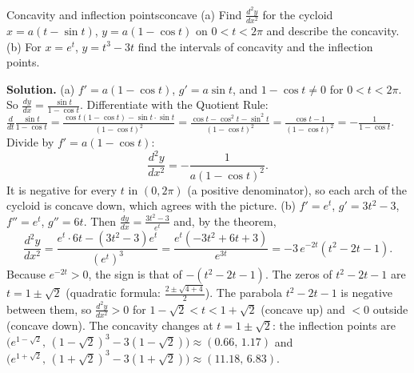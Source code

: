 \documentclass[11pt]{article}
\begin{document}
\begin{exmp}{Concavity and inflection points}{concave}
(a) Find $\frac{d^2y}{dx^2}$ for the cycloid $x=a(t-\sin t)$, $y=a(1-\cos t)$ on $0<t<2\pi$ and describe the concavity. (b) For $x=e^t$, $y=t^3-3t$ find the intervals of concavity and the inflection points.

\textbf{Solution.} (a) $f'=a(1-\cos t)$, $g'=a\sin t$, and $1-\cos t\ne0$ for $0<t<2\pi$. So $\frac{dy}{dx}=\frac{\sin t}{1-\cos t}$. Differentiate with the Quotient Rule: $\frac{d}{dt}\frac{\sin t}{1-\cos t}=\frac{\cos t(1-\cos t)-\sin t\cdot\sin t}{(1-\cos t)^2}=\frac{\cos t-\cos^2t-\sin^2t}{(1-\cos t)^2}=\frac{\cos t-1}{(1-\cos t)^2}=-\frac1{1-\cos t}$. Divide by $f'=a(1-\cos t)$:
\[
\frac{d^2y}{dx^2}=-\frac1{a(1-\cos t)^2}.
\]
It is negative for every $t$ in $(0,2\pi)$ (a positive denominator), so each arch of the cycloid is concave down, which agrees with the picture. (b) $f'=e^t$, $g'=3t^2-3$, $f''=e^t$, $g''=6t$. Then $\frac{dy}{dx}=\frac{3t^2-3}{e^t}$ and, by the theorem,
\[
\frac{d^2y}{dx^2}=\frac{e^t\cdot6t-(3t^2-3)e^t}{(e^t)^3}=\frac{e^t\left(-3t^2+6t+3\right)}{e^{3t}}=-3\,e^{-2t}\left(t^2-2t-1\right).
\]
Because $e^{-2t}>0$, the sign is that of $-(t^2-2t-1)$. The zeros of $t^2-2t-1$ are $t=1\pm\sqrt2$ (quadratic formula: $\frac{2\pm\sqrt{4+4}}2$). The parabola $t^2-2t-1$ is negative between them, so $\frac{d^2y}{dx^2}>0$ for $1-\sqrt2<t<1+\sqrt2$ (concave up) and $<0$ outside (concave down). The concavity changes at $t=1\pm\sqrt2$: the inflection points are $\bigl(e^{1-\sqrt2},\,(1-\sqrt2)^3-3(1-\sqrt2)\bigr)\approx(0.66,\,1.17)$ and $\bigl(e^{1+\sqrt2},\,(1+\sqrt2)^3-3(1+\sqrt2)\bigr)\approx(11.18,\,6.83)$.
\end{exmp}
\end{document}
